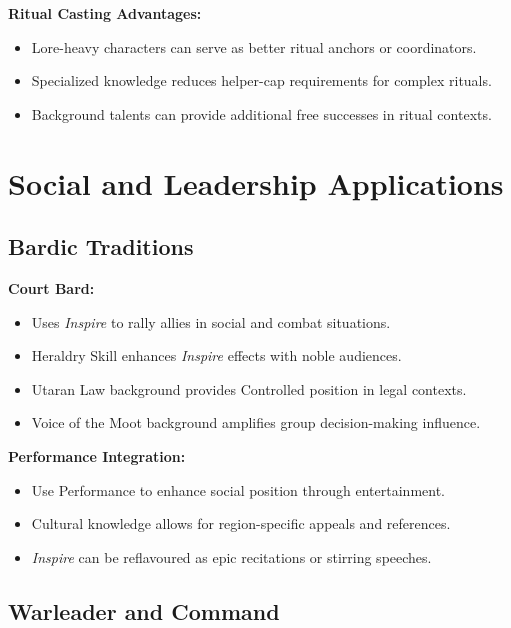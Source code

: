 \textbf{Ritual Casting Advantages:}
\begin{itemize}
    \item Lore-heavy characters can serve as better ritual anchors or coordinators.
    \item Specialized knowledge reduces helper-cap requirements for complex rituals.
    \item Background talents can provide additional free successes in ritual contexts.
\end{itemize}

\section{Social and Leadership Applications}\label{sec:social_applications}

\subsection{Bardic Traditions}\label{subsec:bardic_traditions}

\textbf{Court Bard:}
\begin{itemize}
    \item Uses \emph{Inspire} to rally allies in social and combat situations.
    \item Heraldry Skill enhances \emph{Inspire} effects with noble audiences.
    \item Utaran Law background provides Controlled position in legal contexts.
    \item Voice of the Moot background amplifies group decision-making influence.
\end{itemize}

\textbf{Performance Integration:}
\begin{itemize}
    \item Use Performance to enhance social position through entertainment.
    \item Cultural knowledge allows for region-specific appeals and references.
    \item \emph{Inspire} can be reflavoured as epic recitations or stirring speeches.
\end{itemize}

\subsection{Warleader and Command}\label{subsec:warleader_command}

